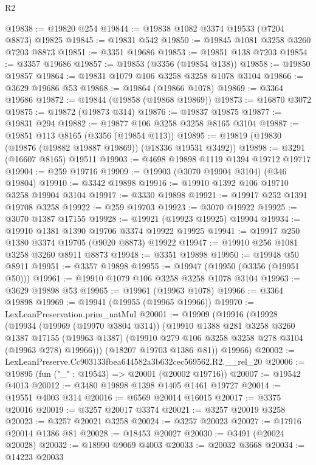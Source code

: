 \begin{lexlean}{R2}
\begin{coremodule}
@19838 := @19820 @254
@19844 := @19838 @1082 @3374 @19533 (@7204 @8873) @19825
@19845 := @19831 @542
@19850 := @19845 @1081 @3258 @3260 @7203 @8873
@19851 := @3351 @19686
@19853 := @19851 @138 @7203
@19854 := @3357 @19686
@19857 := @19853 (@3356 (@19854 @138))
@19858 := @19850 @19857
@19864 := @19831 @1079 @106 @3258 @3258 @1078 @3104
@19866 := @3629 @19686 @53
@19868 := @19864 (@19866 @1078)
@19869 := @3364 @19686
@19872 := @19844 (@19858 (@19868 @19869))
@19873 := @16870 @3072
@19875 := @19872 (@19873 @314)
@19876 := @19837 @19875
@19877 := @19831 @294
@19882 := @19877 @106 @3258 @3258 @8165 @3104
@19887 := @19851 @113 @8165 (@3356 (@19854 @113))
@19895 := @19819 (@19830 (@19876 (@19882 @19887 @19869)) (@18336 @19531 @3492))
@19898 := @3291 (@16607 @8165) @19511
@19903 := @4698 @19898 @1119 @1394 @19712 @19717
@19904 := @259 @19716
@19909 := @19903 (@3070 @19904 @3104) (@346 @19804)
@19910 := @3342 @19898
@19916 := @19910 @1392 @106 @19710 @3258 @19904 @3104
@19917 := @3330 @19898
@19921 := @19917 @252 @1391 @19708 @3258
@19922 := @259 @19703
@19923 := @3070 @19922
@19925 := @3070 @1387 @17155
@19928 := @19921 (@19923 @19925) @19904
@19934 := @19910 @1381 @1390 @19706 @3374 @19922 @19925
@19941 := @19917 @250 @1380 @3374 @19705 (@9020 @8873) @19922
@19947 := @19910 @256 @1081 @3258 @3260 @8911 @8873
@19948 := @3351 @19898
@19950 := @19948 @50 @8911
@19951 := @3357 @19898
@19955 := @19947 (@19950 (@3356 (@19951 @50)))
@19961 := @19910 @1079 @106 @3258 @3258 @1078 @3104
@19963 := @3629 @19898 @53
@19965 := @19961 (@19963 @1078)
@19966 := @3364 @19898
@19969 := @19941 (@19955 (@19965 @19966))
@19970 := LexLeanPreservation.prim_natMul
@20001 := @19909
    (@19916
      (@19928
        (@19934
          (@19969 (@19970 @3804 @314))
          (@19910
            @1388
            @281
            @3258
            @3260
            @1387
            @17155
            (@19963 @1387)
            (@19910 @279 @106 @3258 @3258 @278 @3104 (@19963 @278) @19966)))
        (@18207 @19703 @1386 @81))
      @19966)
@20002 := LexLeanPreserve.Cc903133fbea644582a3b632cec569562.R2.__rel_20
@20006 := @19895 (fun ("_" : @19543) => @20001 (@20002 @19716))
@20007 := @19542 @4013
@20012 := @3480 @19898 @1398 @1405 @1461 @19727
@20014 := @19551 @4003 @314
@20016 := @6569 @20014 @16015
@20017 := @3375 @20016
@20019 := @3257 @20017 @3374
@20021 := @3257 @20019 @3258
@20023 := @3257 @20021 @3258
@20024 := @3257 @20023
@20027 := @17916 @20014 @1386 @81
@20028 := @18453 @20027
@20030 := @3491 (@20024 @20028)
@20032 := @18990 @9069 @4003
@20033 := @20032 @3668
@20034 := @14223 @20033

\end{coremodule}
\end{lexlean}

